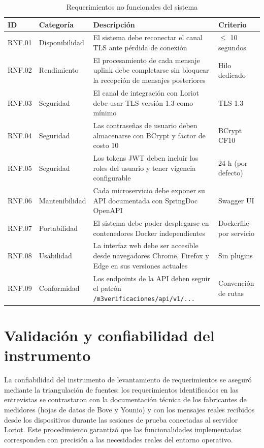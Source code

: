 \documentclass[12pt,a4paper,oneside]{report}
\begin{document}
\begin{table}[H]
\caption{Requerimientos no funcionales del sistema}
\label{tab:rnf}
\centering
\begin{tabularx}{\textwidth}{llXl}
\toprule
\textbf{ID} & \textbf{Categoría} & \textbf{Descripción} & \textbf{Criterio} \\
\midrule
RNF.01 & Disponibilidad & El sistema debe reconectar el canal TLS ante pérdida de conexión & $\leq$ 10 segundos \\
RNF.02 & Rendimiento & El procesamiento de cada mensaje uplink debe completarse sin bloquear la recepción de mensajes posteriores & Hilo dedicado \\
RNF.03 & Seguridad & El canal de integración con Loriot debe usar TLS versión 1.3 como mínimo & TLS 1.3 \\
RNF.04 & Seguridad & Las contraseñas de usuario deben almacenarse con BCrypt y factor de costo 10 & BCrypt CF10 \\
RNF.05 & Seguridad & Los tokens JWT deben incluir los roles del usuario y tener vigencia configurable & 24 h (por defecto) \\
RNF.06 & Mantenibilidad & Cada microservicio debe exponer su API documentada con SpringDoc OpenAPI & Swagger UI \\
RNF.07 & Portabilidad & El sistema debe poder desplegarse en contenedores Docker independientes & Dockerfile por servicio \\
RNF.08 & Usabilidad & La interfaz web debe ser accesible desde navegadores Chrome, Firefox y Edge en sus versiones actuales & Sin plugins \\
RNF.09 & Conformidad & Los endpoints de la API deben seguir el patrón \texttt{/m3verificaciones/api/v1/...} & Convención de rutas \\
\bottomrule
\end{tabularx}
\end{table}

\section{Validación y confiabilidad del instrumento}\label{validaciuxf3n-y-confiabilidad-del-instrumento}

La confiabilidad del instrumento de levantamiento de requerimientos se aseguró mediante la triangulación de fuentes: los requerimientos identificados en las entrevistas se contrastaron con la documentación técnica de los fabricantes de medidores (hojas de datos de Bove y Younio) y con los mensajes reales recibidos desde los dispositivos durante las sesiones de prueba conectadas al servidor Loriot. Este procedimiento garantizó que las funcionalidades implementadas corresponden con precisión a las necesidades reales del entorno operativo.
\end{document}
